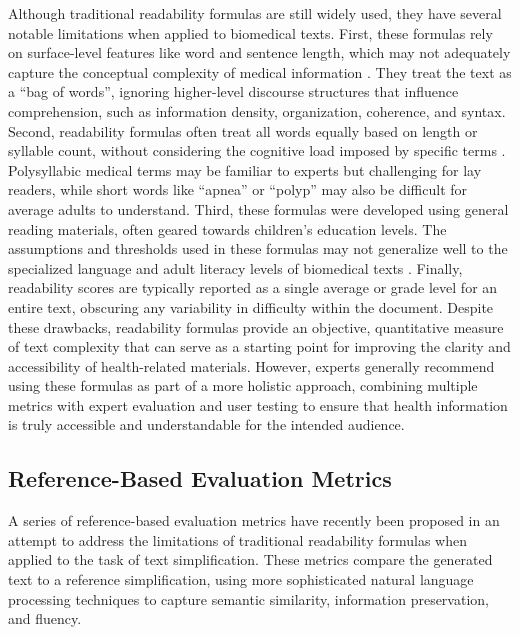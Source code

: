 Although traditional readability formulas are still widely used, they have several notable limitations when applied to biomedical texts. First, these formulas rely on surface-level features like word and sentence length, which may not adequately capture the conceptual complexity of medical information \cite{Crossley2022, WANG2013503, Singh2024}.
They treat the text as a ``bag of words'', ignoring higher-level discourse structures that influence comprehension, such as information density, organization, coherence, and syntax.  
Second, readability formulas often treat all words equally based on length or syllable count, without considering the cognitive load imposed by specific terms \cite{Swanson2024}. Polysyllabic medical terms may be familiar to experts but challenging for lay readers, while short words like ``apnea'' or ``polyp'' may also be difficult for average adults to understand.
Third, these formulas were developed using general reading materials, often geared towards children's education levels. The assumptions and thresholds used in these formulas may not generalize well to the specialized language and adult literacy levels of biomedical texts \cite{Crossley2022}.
Finally, readability scores are typically reported as a single average or grade level for an entire text, obscuring any variability in difficulty within the document.
Despite these drawbacks, readability formulas provide an objective, quantitative measure of text complexity that can serve as a starting point for improving the clarity and accessibility of health-related materials. However, experts generally recommend using these formulas as part of a more holistic approach, combining multiple metrics with expert evaluation and user testing to ensure that health information is truly accessible and understandable for the intended audience.

\subsection{Reference-Based Evaluation Metrics}

A series of reference-based evaluation metrics have recently been proposed in an attempt to address the limitations of traditional readability formulas when applied to the task of text simplification. 
These metrics compare the generated text to a reference simplification, using more sophisticated natural language processing techniques to capture semantic similarity, information preservation, and fluency.

